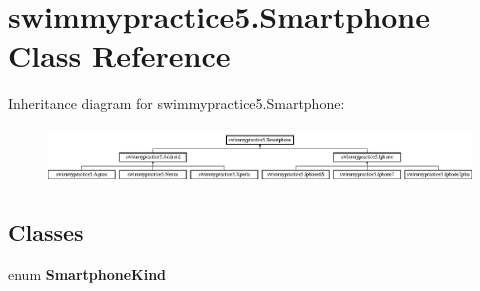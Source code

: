 \hypertarget{classswimmypractice5_1_1_smartphone}{}\section{swimmypractice5.\+Smartphone Class Reference}
\label{classswimmypractice5_1_1_smartphone}
Inheritance diagram for swimmypractice5.\+Smartphone\+:\begin{figure}[H]
\begin{center}
\leavevmode
\includegraphics[height=1.489362cm]{classswimmypractice5_1_1_smartphone}
\end{center}
\end{figure}
\subsection*{Classes}
\begin{DoxyCompactItemize}
\item 
enum {\bfseries Smartphone\+Kind}
\end{DoxyCompactItemize}
